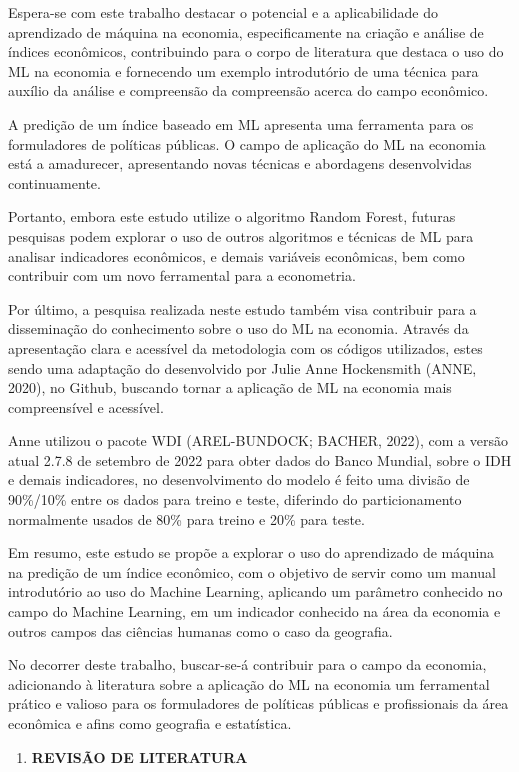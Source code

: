 \documentclass[
]{article}
\providecommand{\tightlist}{%
  \setlength{\itemsep}{0pt}\setlength{\parskip}{0pt}}
\begin{document}
Espera-se com este trabalho destacar o potencial e a aplicabilidade do
aprendizado de máquina na economia, especificamente na criação e análise
de índices econômicos, contribuindo para o corpo de literatura que
destaca o uso do ML na economia e fornecendo um exemplo introdutório de
uma técnica para auxílio da análise e compreensão da compreensão acerca
do campo econômico.

A predição de um índice baseado em ML apresenta uma ferramenta para os
formuladores de políticas públicas. O campo de aplicação do ML na
economia está a amadurecer, apresentando novas técnicas e abordagens
desenvolvidas continuamente.

Portanto, embora este estudo utilize o algoritmo Random Forest, futuras
pesquisas podem explorar o uso de outros algoritmos e técnicas de ML
para analisar indicadores econômicos, e demais variáveis econômicas, bem
como contribuir com um novo ferramental para a econometria.

Por último, a pesquisa realizada neste estudo também visa contribuir
para a disseminação do conhecimento sobre o uso do ML na economia.
Através da apresentação clara e acessível da metodologia com os códigos
utilizados, estes sendo uma adaptação do desenvolvido por Julie Anne
Hockensmith (ANNE, 2020), no Github, buscando tornar a aplicação de ML
na economia mais compreensível e acessível.

Anne utilizou o pacote WDI (AREL-BUNDOCK; BACHER, 2022), com a versão
atual 2.7.8 de setembro de 2022 para obter dados do Banco Mundial, sobre
o IDH e demais indicadores, no desenvolvimento do modelo é feito uma
divisão de 90\%/10\% entre os dados para treino e teste, diferindo do
particionamento normalmente usados de 80\% para treino e 20\% para
teste.

Em resumo, este estudo se propõe a explorar o uso do aprendizado de
máquina na predição de um índice econômico, com o objetivo de servir
como um manual introdutório ao uso do Machine Learning, aplicando um
parâmetro conhecido no campo do Machine Learning, em um indicador
conhecido na área da economia e outros campos das ciências humanas como
o caso da geografia.

No decorrer deste trabalho, buscar-se-á contribuir para o campo da
economia, adicionando à literatura sobre a aplicação do ML na economia
um ferramental prático e valioso para os formuladores de políticas
públicas e profissionais da área econômica e afins como geografia e
estatística.

\begin{enumerate}
\def\labelenumi{\arabic{enumi}.}
\setcounter{enumi}{1}
\tightlist
\item
  \textbf{REVISÃO DE LITERATURA}
\end{enumerate}
\end{document}
